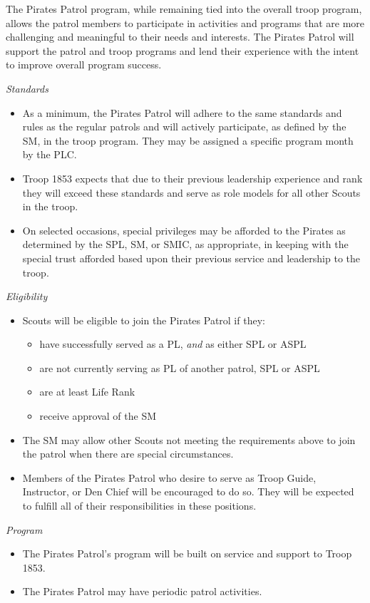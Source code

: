 \documentclass{ltxguide}
\begin{document}
The Pirates Patrol program, while remaining tied into the overall troop program, allows the patrol members to participate in activities and programs that are more challenging and meaningful to their needs and interests. The Pirates Patrol will support the patrol and troop programs and lend their experience with the intent to improve overall program success.

\textit{Standards}
\begin{itemize}
	\item As a minimum, the Pirates Patrol will adhere to the same standards and rules as the regular patrols and will actively participate, as defined by the SM, in the troop program. They may be assigned a specific program month by the \ac{PLC}.
	\item Troop 1853 expects that due to their previous leadership experience and rank they will exceed these standards and serve as role models for all other Scouts in the troop.
	\item On selected occasions, special privileges may be afforded to the Pirates as determined by the \ac{SPL}, \ac{SM}, or \ac{SMIC}, as appropriate, in keeping with the special trust afforded based upon their previous service and leadership to the troop.
\end{itemize}

\textit{Eligibility}
\begin{itemize}
	\item Scouts will be eligible to join the Pirates Patrol if they:
	\begin{itemize}
		\item have successfully served as a \ac{PL}, \textit{and} as either SPL or ASPL
		\item are not currently serving as PL of another patrol, SPL or ASPL
		\item are at least Life Rank
		\item receive approval of the \ac{SM}
	\end{itemize}
	\item The \ac{SM} may allow other Scouts not meeting the requirements above to join the patrol when there are special circumstances.
	\item Members of the Pirates Patrol who desire to serve as Troop Guide, Instructor, or Den Chief will be encouraged to do so. They will be expected to fulfill all of their responsibilities in these positions.
\end{itemize}

\textit{Program}
\begin{itemize}
	\item The Pirates Patrol's program will be built on service and support to Troop 1853.
	\item The Pirates Patrol may have periodic patrol activities.
\end{itemize}
\end{document}
